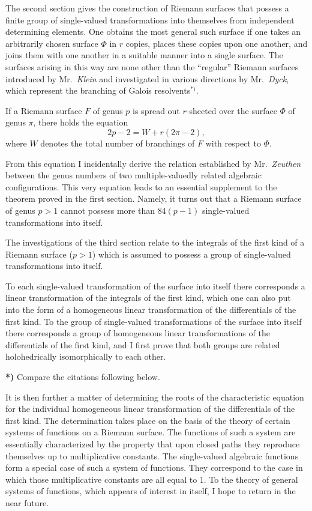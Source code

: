 \documentclass{article}
\begin{document}
The second section gives the construction of Riemann surfaces that possess a finite group of single-valued transformations into themselves from independent determining elements. One obtains the most general such surface if one takes an arbitrarily chosen surface $\Phi$ in $r$ copies, places these copies upon one another, and joins them with one another in a suitable manner into a single surface. The surfaces arising in this way are none other than the ``regular'' Riemann surfaces introduced by Mr.~\emph{Klein} and investigated in various directions by Mr.~\emph{Dyck}, which represent the branching of Galois resolvents${}^{*)}$.

If a Riemann surface $F$ of genus $p$ is spread out $r$-sheeted over the surface $\Phi$ of genus $\pi$, there holds the equation
\[
2p - 2 = W + r(2\pi - 2),
\]
where $W$ denotes the total number of branchings of $F$ with respect to $\Phi$.

From this equation I incidentally derive the relation established by Mr.~\emph{Zeuthen} between the genus numbers of two multiple-valuedly related algebraic configurations. This very equation leads to an essential supplement to the theorem proved in the first section. Namely, it turns out that a Riemann surface of genus $p > 1$ cannot possess more than $84(p-1)$ single-valued transformations into itself.

The investigations of the third section relate to the integrals of the first kind of a Riemann surface ($p > 1$) which is assumed to possess a group of single-valued transformations into itself.

To each single-valued transformation of the surface into itself there corresponds a linear transformation of the integrals of the first kind, which one can also put into the form of a homogeneous linear transformation of the differentials of the first kind. To the group of single-valued transformations of the surface into itself there corresponds a group of homogeneous linear transformations of the differentials of the first kind, and I first prove that both groups are related holohedrically isomorphically to each other.

\textbf{*)} Compare the citations following below.

It is then further a matter of determining the roots of the characteristic equation for the individual homogeneous linear transformation of the differentials of the first kind. The determination takes place on the basis of the theory of certain systems of functions on a Riemann surface. The functions of such a system are essentially characterized by the property that upon closed paths they reproduce themselves up to multiplicative constants. The single-valued algebraic functions form a special case of such a system of functions. They correspond to the case in which those multiplicative constants are all equal to $1$. To the theory of general systems of functions, which appears of interest in itself, I hope to return in the near future.
\end{document}
